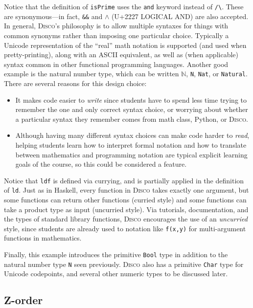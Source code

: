 \documentclass[submission,copyright,creativecommons]{eptcs}
\newcommand{\disco}{\textsc{Disco}\xspace}
\newcommand{\N}{\mathbb{N}}
\begin{document}
Notice that the definition of \verb|isPrime| uses the \verb|and|
keyword instead of \verb|/\|.  These are synonymous---in fact,
\verb|&&| and $\land$ (U+2227 LOGICAL AND) are also accepted.  In
general, \disco's philosophy is to allow multiple syntaxes for things
with common synonyms rather than imposing one particular choice.
Typically a Unicode representation of the ``real'' math notation is
supported (and used when pretty-printing), along with an ASCII
equivalent, as well as (when applicable) syntax common in other
functional programming languages.  Another good example is the natural
number type, which can be written $\N$, \verb|N|, \verb|Nat|, or
\verb|Natural|.  There are several reasons for this design choice:
\begin{itemize}
\item It makes code easier to \emph{write} since students have to
  spend less time trying to remember the one and only correct syntax
  choice, or worrying about whether a particular syntax they remember
  comes from math class, Python, or \disco.
\item Although having many different syntax choices can make code
  harder to \emph{read}, helping students learn how to interpret
  formal notation and how to translate between mathematics and
  programming notation are typical explicit learning goals of the
  course, so this could be considered a feature.
\end{itemize}

Notice that \verb|ldf| is defined via currying, and is partially
applied in the definition of \verb|ld|. Just as in Haskell, every
function in \disco takes exactly one argument, but some
functions can return other functions (curried style) and some functions
can take a product type as input (uncurried style).  Via tutorials,
documentation, and the types of standard library functions, \disco
encourages the use of an \emph{uncurried} style, since students are
already used to notation like \verb|f(x,y)| for multi-argument
functions in mathematics.

Finally, this example introduces the primitive \verb|Bool| type in
addition to the natural number type \verb|N| seen previously.  \disco
also has a primitive \verb|Char| type for Unicode codepoints, and
several other numeric types to be discussed later.

\subsection{Z-order}
\label{sec:zorder}
\end{document}
